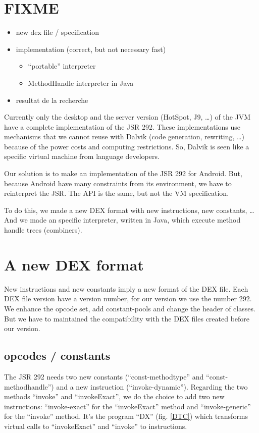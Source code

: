 \documentclass{sig-alternate}
\def \Jsr{JSR\xspace}
\def \JSR{\Jsr 292\xspace}
\begin{document}
\section{FIXME}

  {\color{red}
    \begin{itemize}
      \item new dex file / specification
      \item implementation (correct, but not necessary fast)
            \begin{itemize}
              \item ``portable'' interpreter
              \item MethodHandle interpreter in Java
            \end{itemize}
      \item resultat de la recherche
    \end{itemize}%
  }
  Currently only the desktop and the server version (HotSpot, J9, \dots) of the JVM have a complete implementation of the JSR 292.
  These implementations use mechanisms that we cannot reuse with Dalvik (code generation, rewriting, \dots)
  because of the power costs and computing restrictions.
  So, Dalvik is seen like a specific virtual machine from language developers.
    
  Our solution is to make an implementation of the JSR 292 for Android.
  But, because Android have many constraints from its environment,
  we have to reinterpret the JSR.
  The API is the same, but not the VM specification.
    
  To do this, we made a new DEX format with new instructions, new constants, \dots
  And we made an specific interpreter, written in Java, which execute method handle trees (combiners).

\section{A new DEX format}

  New instructions and new constants imply a new format of the DEX file.
  Each DEX file version have a version number, for our version we use the number 292.
  We enhance the opcode set, add constant-pools and change the header of classes.
  But we have to maintained the compatibility with the DEX files created before our version.

  \subsection{opcodes / constants}
    The \JSR needs two new constants (``const-methodtype'' and ``const-methodhandle'') and a new instruction (``invoke-dynamic'').
    Regarding the two methods ``invoke'' and ``invokeExact'', we do the choice to add two new instructions:
    ``invoke-exact'' for the ``invokeExact'' method and ``invoke-generic'' for the ``invoke'' method.
    It's the program ``DX'' (fig. \ref{DTC}) which transforms virtual calls to ``invokeExact'' and ``invoke'' to instructions.
\end{document}
